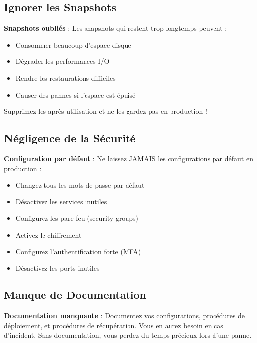 \documentclass[11pt,a4paper]{article}
\begin{document}
\subsection{Ignorer les Snapshots}

\begin{dangerbox}
\textbf{Snapshots oubliés} : Les snapshots qui restent trop longtemps peuvent :
\begin{itemize}
    \item Consommer beaucoup d'espace disque
    \item Dégrader les performances I/O
    \item Rendre les restaurations difficiles
    \item Causer des pannes si l'espace est épuisé
\end{itemize}
Supprimez-les après utilisation et ne les gardez pas en production !
\end{dangerbox}

\subsection{Négligence de la Sécurité}

\begin{dangerbox}
\textbf{Configuration par défaut} : Ne laissez JAMAIS les configurations par défaut en production :
\begin{itemize}
    \item Changez tous les mots de passe par défaut
    \item Désactivez les services inutiles
    \item Configurez les pare-feu (security groups)
    \item Activez le chiffrement
    \item Configurez l'authentification forte (MFA)
    \item Désactivez les ports inutiles
\end{itemize}
\end{dangerbox}

\subsection{Manque de Documentation}

\begin{dangerbox}
\textbf{Documentation manquante} : Documentez vos configurations, procédures de déploiement, et procédures de récupération. Vous en aurez besoin en cas d'incident. Sans documentation, vous perdez du temps précieux lors d'une panne.
\end{dangerbox}
\end{document}
